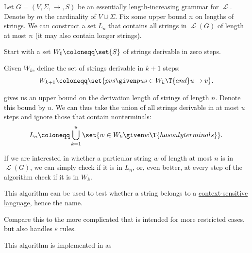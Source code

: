 \begin{algorithm}\label{alg:context_sensitive_string_membership}
  Let \( G = (V, \Sigma, \to, S) \) be an \hyperref[def:length_increasing_grammar]{essentially length-increasing} grammar for \( \mscrL \). Denote by \( m \) the cardinality of \( V \cup \Sigma \). Fix some upper bound \( n \) on lengths of strings. We can construct a set \( L_n \) that contains all strings in \( \mscrL(G) \) of length at most \( n \) (it may also contain longer strings).

  \begin{thmenum}
     Start with a set \( W_0 \coloneqq \set{ S } \) of strings derivable in zero steps.

     Given \( W_k \), define the set of strings derivable in \( k + 1 \) steps:
    \begin{equation*}
      W_{k+1} \coloneqq \set{ p v s \given p u s \in W_k \T{and} u \to v }.
    \end{equation*}

      gives us an upper bound on the derivation length of strings of length \( n \). Denote this bound by \( u \). We can thus take the union of all strings derivable in at most \( u \) steps and ignore those that contain nonterminals:
    \begin{equation*}
      L_n \coloneqq \bigcup_{k=1}^u \set{ w \in W_k \given w \T{has only terminals} }.
    \end{equation*}

     If we are interested in whether a particular string \( w \) of length at most \( n \) is in \( \mscrL(G) \), we can simply check if it is in \( L_n \), or, even better, at every step of the algorithm check if it is in \( W_k \).
  \end{thmenum}
\end{algorithm}
\begin{comments}
  \item This algorithm can be used to test whether a string belongs to a \hyperref[def:chomsky_hierarchy/context_sensitive]{context-sensitive language}, hence the name.

  \item Compare this to the more complicated  that is intended for more restricted cases, but also handles \( \varepsilon \) rules.

  \item This algorithm is implemented in \cite{notebook:code} as
  \begin{CodeRefDisplay}
  \end{CodeRefDisplay}
\end{comments}


